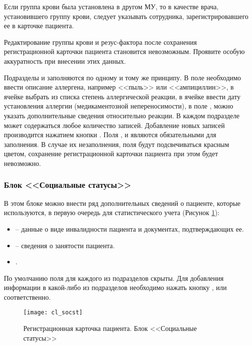 Если группа крови была установлена в другом МУ, то в качестве врача, установившего группу крови, следует указывать сотрудника, зарегистрировавшего ее в карточке пациента.

\begin{vnim}
Редактирование группы крови и резус-фактора после сохранения регистрационной карточки пациента становится невозможным. Проявите особую аккуратность при внесении этих данных.
\end{vnim}

Подразделы  и  заполняются по одному и тому же принципу. В поле   необходимо ввести описание аллергена, например <<пыль>> или <<ампициллин>>, в ячейке  выбрать из списка степень аллергической реакции, в ячейке  ввести дату установления аллергии (медикаментозной непереносимости), в поле , можно указать дополнительные сведения относительно реакции. В каждом подразделе может содержаться любое количество записей. Добавление новых записей производится нажатием кнопки . Поля ,  и  являются обязательными для заполнения. В случае их незаполнения, поля будут подсвечиваться красным цветом, сохранение регистрационной карточки пациента при этом будет невозможно.

\subsubsection{Блок <<Социальные статусы>>} 

В этом блоке можно внести ряд дополнительных сведений о пациенте, которые используются, в первую очередь для статистического учета (Рисунок \ref{img_cl_socst}): 
\begin{itemize}
 \item {} -- данные о виде инвалидности пациента и документах, подтверждающих ее.
 \item {} -- сведения о занятости пациента.
 \item {}.
\end{itemize}

По умолчанию поля для каждого из подразделов скрыты. Для добавления информации в какой-либо из подразделов необходимо нажать кнопку ,  или  соответственно.

\begin{figure}[ht]\centering
 \texttt{[image: cl\_socst]}
 \caption{Регистрационная карточка пациента. Блок <<Социальные статусы>>}
 \label{img_cl_socst}
\end{figure} 

